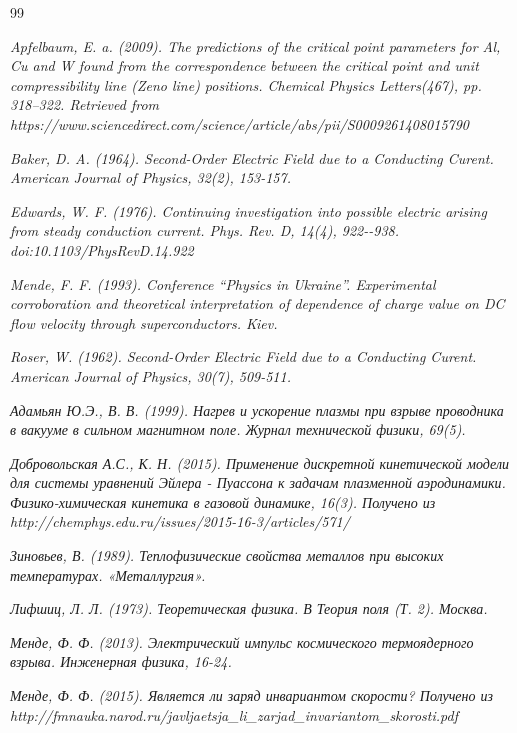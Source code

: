\documentclass[11pt]{article}
\begin{document}
\begin{thebibliography}{99}

\textit{Apfelbaum, E. a. (2009). The predictions of the critical point parameters for Al, Cu and W found from the correspondence
between the critical point and unit compressibility line (Zeno line)
positions. Chemical Physics Letters(467), pp. 318--322. Retrieved from
https://www.sciencedirect.com/science/article/abs/pii/S0009261408015790
}

\textit{Baker, D. A. (1964). Second-Order Electric Field due to a Conducting
Curent. American Journal of Physics, 32(2), 153-157.}

\textit{Edwards, W. F. (1976). Continuing investigation into possible electric arising from
steady conduction current. Phys. Rev. D, 14(4), 922-\/-938.
doi:10.1103/PhysRevD.14.922
}


\textit{Mende, F. F. (1993). Conference ``Physics in Ukraine''. Experimental corroboration and theoretical interpretation of dependence of charge value on DC flow velocity through superconductors.
Kiev.
}

\textit{Roser, W. (1962). Second-Order Electric Field due to a Conducting
Curent. American Journal of Physics, 30(7), 509-511.
}

\textit{Адамьян Ю.Э., В. В. (1999). Нагрев и ускорение плазмы при взрыве проводника в вакууме в
сильном магнитном поле. Журнал технической физики, 69(5).
}

\textit{Добровольская А.С., К. Н. (2015). Применение дискретной кинетической модели для
системы уравнений Эйлера - Пуассона к задачам плазменной аэродинамики.
Физико-химическая кинетика в газовой динамике, 16(3). Получено из
http://chemphys.edu.ru/issues/2015-16-3/articles/571/
}

\textit{Зиновьев, В. (1989). Теплофизические свойства металлов при высоких температурах.
«Металлургия».
}

\textit{Лифшиц, Л. Л. (1973). Теоретическая физика. В Теория поля
(Т. 2). Москва.
}

\textit{Менде, Ф. Ф. (2013). Электрический импульс космического
термоядерного взрыва. Инженерная физика, 16-24.
}

\textit{Менде, Ф. Ф. (2015). Является ли заряд инвариантом скорости? Получено из
http://fmnauka.narod.ru/javljaetsja\_li\_zarjad\_invariantom\_skorosti.pdf
}


\end{thebibliography}
\end{document}
